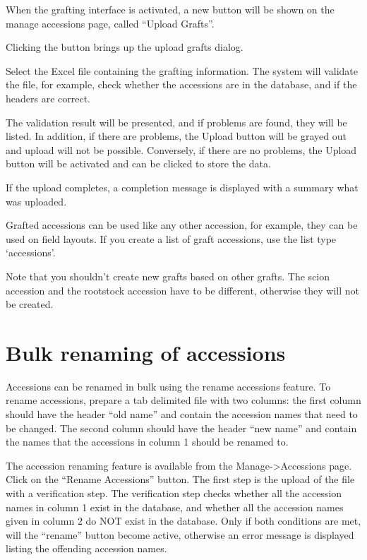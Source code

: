 \documentclass[
  12pt,
]{book}
\begin{document}
When the grafting interface is activated, a new button will be shown on the manage accessions page, called ``Upload Grafts''.

Clicking the button brings up the upload grafts dialog.

Select the Excel file containing the grafting information. The system will validate the file, for example, check whether the accessions are in the database, and if the headers are correct.

The validation result will be presented, and if problems are found, they will be listed. In addition, if there are problems, the Upload button will be grayed out and upload will not be possible. Conversely, if there are no problems, the Upload button will be activated and can be clicked to store the data.

If the upload completes, a completion message is displayed with a summary what was uploaded.

Grafted accessions can be used like any other accession, for example, they can be used on field layouts. If you create a list of graft accessions, use the list type `accessions'.

Note that you shouldn't create new grafts based on other grafts. The scion accession and the rootstock accession have to be different, otherwise they will not be created.

\hypertarget{bulk-renaming-of-accessions}{%
\section{Bulk renaming of accessions}\label{bulk-renaming-of-accessions}}

Accessions can be renamed in bulk using the rename accessions feature. To rename accessions, prepare a tab delimited file with two columns: the first column should have the header ``old name'' and contain the accession names that need to be changed. The second column should have the header ``new name'' and contain the names that the accessions in column 1 should be renamed to.

The accession renaming feature is available from the Manage-\textgreater Accessions page. Click on the ``Rename Accessions'' button. The first step is the upload of the file with a verification step. The verification step checks whether all the accession names in column 1 exist in the database, and whether all the accession names given in column 2 do NOT exist in the database. Only if both conditions are met, will the ``rename'' button become active, otherwise an error message is displayed listing the offending accession names.
\end{document}
